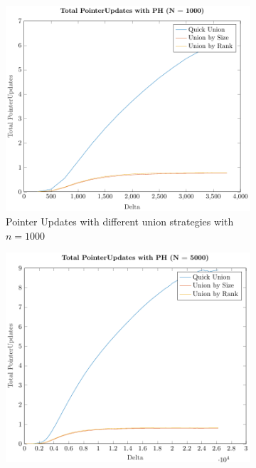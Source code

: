 \begin{figure}[ht]
    \centering
    \begin{subfigure}{0.32\textwidth}
        \centering
        \includegraphics[width=\textwidth]{../images/plotPHFull1000_PointerUpdates.pdf}
        \caption{Pointer Updates with different union strategies with $n = 1000$}
    \end{subfigure}%
    \hfill
    \begin{subfigure}{0.32\textwidth}
        \centering
        \includegraphics[width=\textwidth]{../images/plotPHFull5000_PointerUpdates.pdf}

\end{subfigure}
\end{figure}
